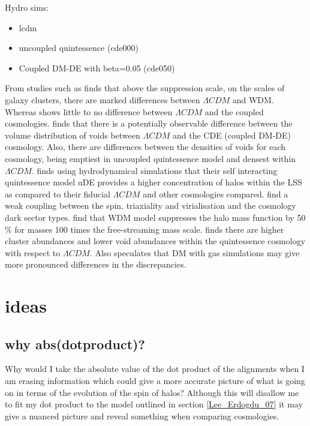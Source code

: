 \documentclass[fleqn,usenatbib]{mnras}
\begin{document}
Hydro sims:
\begin{itemize}
\item lcdm
\item uncoupled quintessence (cde000) 
\item Coupled DM-DE with beta=0.05 (cde050) 
\end{itemize}
From studies such as \citet{Elahi_14} finds that above the suppression scale, on the scales of galaxy clusters, there are marked differences between $\Lambda CDM$ and WDM. Whereas \citet{Elahi_15} shows little to no difference between $\Lambda CDM$ and the coupled cosmologies. \citet{Adermann_17} finds that there is a potentially observable difference between the volume distribution of voids between $\Lambda CDM$ and the CDE (coupled DM-DE) cosmology. Also, there are differences between the densities of voids for each cosmology, being emptiest in uncoupled quintessence model and densest within $\Lambda CDM$. \citet{Carlesi_14a} finds using hydrodynamical simulations that their  self interacting quintessence model uDE provides a higher concentration of halos within the LSS as compared to their fiducial $\Lambda CDM$ and other cosmologies compared. \citet{Carlesi_14b} find a weak coupling between the spin, triaxiality and virialisation and the cosmology dark sector types. \citet{Smith_11} find that WDM model suppresses the halo mass function by 50$\%$ for masses 100 times the free-streaming mass scale. \citet{Watts_17} finds there are higher cluster abundances and lower void abundances within the quintessence cosmology with respect to $\Lambda CDM$. Also speculates that DM with gas simulations may give more pronounced differences in the discrepancies.
\section{ideas}
\subsection{why abs(dotproduct)?}
Why would I take the absolute value of the dot product of the alignments when I am erasing information which could give a more accurate picture of what is going on in terms of the evolution of the spin of halos? Although this will disallow me to fit my dot product to the model outlined in section \ref{Lee_Erdogdu_07} it may give a nuanced picture and reveal something when comparing cosmologies.
\end{document}
